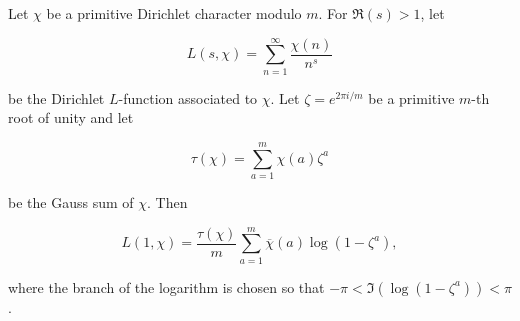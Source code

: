 Let $\chi$ be a primitive Dirichlet character modulo $m$. For $\Re(s) > 1$, let

$$L(s, \chi) = \sum_{n=1}^{\infty} \frac{\chi(n)}{n^s}$$

be the Dirichlet $L$-function associated to $\chi$. Let $\zeta = e^{2\pi i / m}$ be a primitive $m$-th root of unity and let

$$\tau(\chi) = \sum_{a=1}^{m} \chi(a) \zeta^a$$

be the Gauss sum of $\chi$. Then

$$L(1, \chi) = \frac{\tau(\chi)}{m} \sum_{a=1}^{m} \overline{\chi}(a) \log(1 - \zeta^a),$$

where the branch of the logarithm is chosen so that $-\pi < \Im(\log(1 - \zeta^a)) < \pi$.
